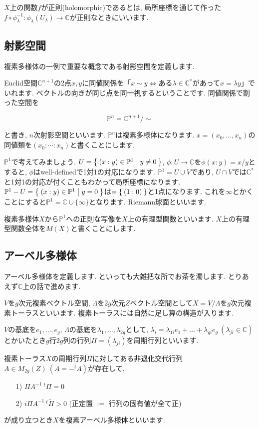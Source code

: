 \documentclass{jsarticle}
\newcommand{\CC}{\mathbb{C}}
\newcommand{\PP}{\mathbb{P}}
\theoremstyle{definition}
\numberwithin{theorem}{section}
\begin{document}
$X$上の関数$f$が正則(holomorphic)であるとは, 局所座標を通じて作った$f\circ\phi_\lambda^{-1}: \phi_\lambda(U_\lambda) \rightarrow \CC$が正則なときにいいます. 

\subsection{射影空間}
複素多様体の一例で重要な概念である射影空間を定義します.

Euclid空間$\CC^{n+1}$の2点$x, y$に同値関係を「$x\sim y\Leftrightarrow $ある$\lambda \in \CC^*$があって$x = \lambda y$」でいれます. ベクトルの向きが同じ点を同一視するということです. 同値関係で割った空間を

\[
\PP^n = \CC^{n+1} / \sim
\]

と書き, $n$次射影空間といいます. $\PP^n$は複素多様体になります. $x = (x_0, \ldots, x_n)$の同値類を$(x_0 : \cdots : x_n)$と書くことにします.

$\PP^1$で考えてみましょう. $U = \Set{(x:y) \in \PP^1 | y \neq 0}$, $\phi: U \rightarrow \CC$を$\phi(x:y) = x / y$とすると, $\phi$はwell-definedで1対1の対応になります. $\PP^1 = U\cup V$であり, $U\cap V$では$\CC^*$と1対1の対応が付くこともわかって局所座標になります. $\PP^1 - U = \Set{(x:y) \in \PP^1 | y = 0}$は$ = \Set{(1:0)}$と1点になります. これを$\infty$とかくことにすると$\PP^1 = \CC \cup \{\infty\}$となります. Riemann球面といいます. 

複素多様体$X$から$\PP^1$への正則な写像を$X$上の有理型関数といいます. $X$上の有理型関数全体を$M(X)$と書くことにします.
\subsection{アーベル多様体}
アーベル多様体を定義します. といっても大雑把な所でお茶を濁します. とりあえず$\CC$上の話で進めます.

$V$を$g$次元複素ベクトル空間, $\Lambda$を$2g$次元$Z$ベクトル空間として$X = V/\Lambda$を$g$次元複素トーラスといいます. 複素トーラスには自然に足し算の構造が入ります. 

$V$の基底を$e_1, \ldots, e_g$, $\Lambda$の基底を$\lambda_1, \ldots, \lambda_{2g}$として, $\lambda_i = \lambda_{1i}e_1 + \ldots + \lambda_{gi}e_g\ (\lambda_{ji} \in \CC)$とかいたとき$g$行$2g$列の行列$\Pi = (\lambda_{ji})$を周期行列といいます.

複素トーラス$X$の周期行列$\Pi$に対してある非退化交代行列$A \in M_{2g}(Z)\ (A = -^tA)$が存在して, 
\begin{itemize}
\item[1)] $\Pi A^{-1}{\ }^t\Pi = 0$
\item[2)] $i \Pi A^{-1}{\ }^t\tilde\Pi > 0$ (正定置 $:=$ 行列の固有値が全て正)
\end{itemize}
が成り立つとき$X$を複素アーベル多様体といいます.
\end{document}
